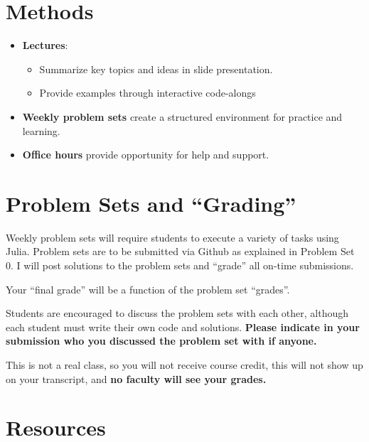 \documentclass[
]{book}
\providecommand{\tightlist}{%
  \setlength{\itemsep}{0pt}\setlength{\parskip}{0pt}}
\begin{document}
\hypertarget{methods}{%
\section{Methods}\label{methods}}

\begin{itemize}
\tightlist
\item
  \textbf{Lectures}:

  \begin{itemize}
  \tightlist
  \item
    Summarize key topics and ideas in slide presentation.
  \item
    Provide examples through interactive code-alongs
  \end{itemize}
\item
  \textbf{Weekly problem sets} create a structured environment for practice and learning.
\item
  \textbf{Office hours} provide opportunity for help and support.
\end{itemize}

\hypertarget{problem-sets-and-grading}{%
\section{Problem Sets and ``Grading''}\label{problem-sets-and-grading}}

Weekly problem sets will require students to execute a variety of tasks using Julia. Problem sets are to be submitted via Github as explained in Problem Set 0. I will post solutions to the problem sets and ``grade'' all on-time submissions.

Your ``final grade'' will be a function of the problem set ``grades''.

Students are encouraged to discuss the problem sets with each other, although each student must write their own code and solutions. \textbf{Please indicate in your submission who you discussed the problem set with if anyone.}

This is not a real class, so you will not receive course credit, this will not show up on your transcript, and \textbf{no faculty will see your grades.}

\hypertarget{resources}{%
\section{Resources}\label{resources}}
\end{document}
